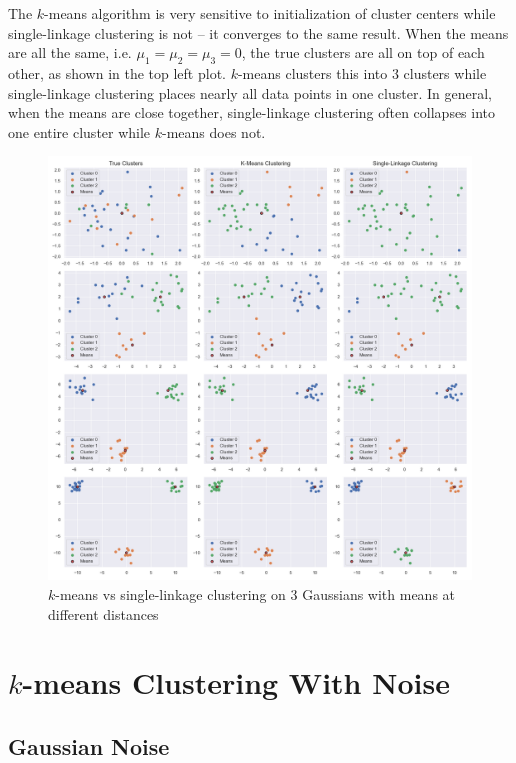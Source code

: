 \documentclass{article}
\begin{document}
    The $k$-means algorithm is very sensitive to initialization of cluster centers while single-linkage clustering is not -- it converges to the same result. When the means are all the same, i.e. $\mu_1 = \mu_2 = \mu_3 = 0$, the true clusters are all on top of each other, as shown in the top left plot. $k$-means clusters this into $3$ clusters while single-linkage clustering places nearly all data points in one cluster. In general, when the means are close together, single-linkage clustering often collapses into one entire cluster while $k$-means does not.

    \begin{figure}[ht]
        \label{fig:kmeans_singlelinkage}
        \includegraphics[width=0.99\linewidth]{images/q1/kmeans_singlelinkage.png}
        \caption{$k$-means vs single-linkage clustering on $3$ Gaussians with means at different distances}
    \end{figure}
    \pagebreak

\section[short]{$k$-means Clustering With Noise}

    \subsection[short]{Gaussian Noise}
\end{document}
